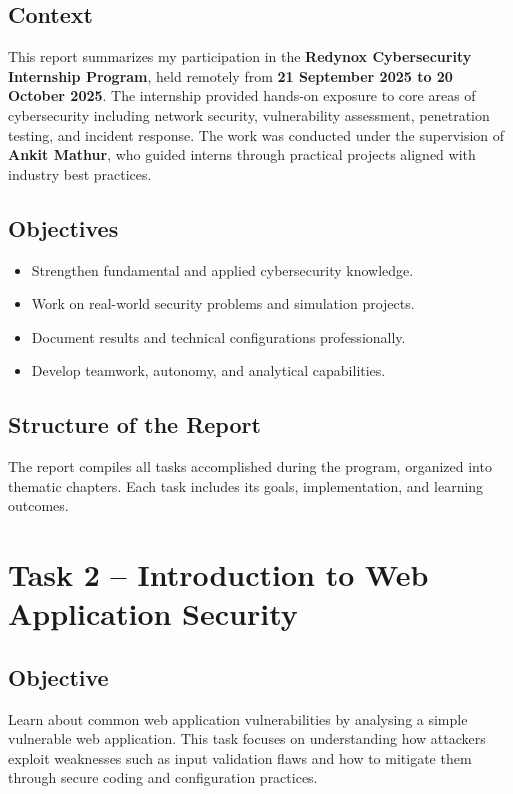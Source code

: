 \documentclass[12pt,a4paper]{report}
\begin{document}
\section{Context}
This report summarizes my participation in the \textbf{Redynox Cybersecurity Internship Program},
held remotely from \textbf{21 September 2025 to 20 October 2025}.  
The internship provided hands-on exposure to core areas of cybersecurity including network security,
vulnerability assessment, penetration testing, and incident response.  
The work was conducted under the supervision of \textbf{Ankit Mathur}, who guided interns through
practical projects aligned with industry best practices.

\section{Objectives}
\begin{itemize}
  \item Strengthen fundamental and applied cybersecurity knowledge.
  \item Work on real-world security problems and simulation projects.
  \item Document results and technical configurations professionally.
  \item Develop teamwork, autonomy, and analytical capabilities.
\end{itemize}

\section{Structure of the Report}
The report compiles all tasks accomplished during the program, organized into thematic chapters.
Each task includes its goals, implementation, and learning outcomes.


\chapter{Task 2 – Introduction to Web Application Security}

\section{Objective}
Learn about common web application vulnerabilities by analysing a simple vulnerable web application. 
This task focuses on understanding how attackers exploit weaknesses such as input validation flaws 
and how to mitigate them through secure coding and configuration practices.
\end{document}

